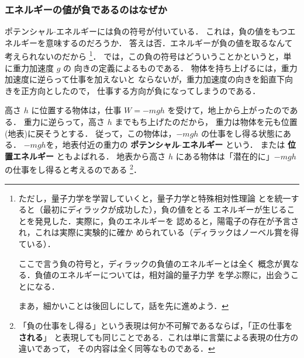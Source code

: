             \subsubsection{エネルギーの値が負であるのはなぜか}
                ポテンシャル$\cdot$エネルギーには負の符号が付いている．
                これは，負の値をもつエネルギーを意味するのだろうか．
                答えは否．エネルギーが負の値を取るなんて考えられないのだから
                    \footnote{
                        ただし，量子力学を学習していくと，量子力学と特殊相対性理論
                        とを統一すると（最初にディラックが成功した），負の値をとる
                        エネルギーが生じることを発見した．実際に，負のエネルギーを
                        認めると，陽電子の存在が予言され，これは実際に実験的に確か
                        められている（ディラックはノーベル賞を得ている）．

                        ここで言う負の符号と，ディラックの負値のエネルギーとは全く
                        概念が異なる．負値のエネルギーについては，相対論的量子力学
                        を学ぶ際に，出会うことになる．

                        まあ，細かいことは後回しにして，話を先に進めよう．
                    }．
                では，この負の符号はどういうことかというと，単に重力加速度 $g$ の
                向きの定義によるものである．
                物体を持ち上げるには，重力加速度に逆らって仕事を加えないと
                ならないが，重力加速度の向きを鉛直下向きを正方向としたので，
                仕事する方向が負になってしまうのである．

                高さ $h$ に位置する物体は，仕事 $W=-mgh$ を受けて，地上から上がったのである．
                重力に逆らって，高さ $h$ までもち上げたのだから，
                重力は物体を元も位置(地表)に戻そうとする．
                従って，この物体は，$-mgh$ の仕事をし得る状態にある．
                $-mgh$を，地表付近の重力の \textbf{ポテンシャル$\cdot$エネルギー} という．
                または \textbf{位置エネルギー} ともよばれる．
                地表から高さ $h$ にある物体は「潜在的に」$-mgh$ の仕事をし得ると考えるのである
                    \footnote{
                        「負の仕事をし得る」という表現は何か不可解であるならば，「正の仕事を\textbf{される}」
                        と表現しても同じことである．これは単に言葉による表現の仕方の違いであって，
                        その内容は全く同等なものである．
                    }．

